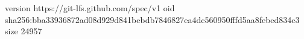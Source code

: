 version https://git-lfs.github.com/spec/v1
oid sha256:bba33936872ad08d929d841bebdb7846827ea4dc560950fffd5aa8febed834c3
size 24957
